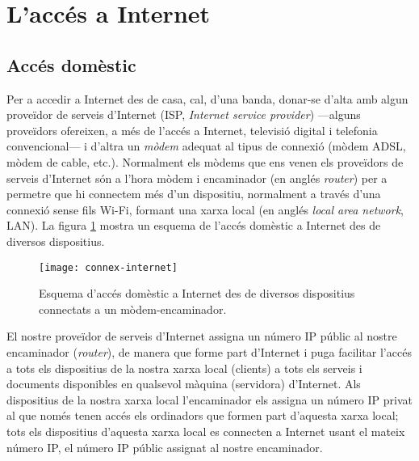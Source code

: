 


\section{L'accés a Internet}
\label{ss:adaI}

\subsection{Accés domèstic}
Per a accedir a Internet des de casa, cal, d'una banda, donar-se
d'alta amb algun proveïdor de serveis d'Internet (ISP, \emph{Internet
  service provider}) ---alguns proveïdors ofereixen, a més de l'accés
a Internet, televisió digital i telefonia convencional--- i d'altra un
\emph{mòdem} adequat al tipus de connexió (mòdem ADSL, mòdem de cable,
etc.). Normalment els mòdems que ens venen els proveïdors de serveis
d'Internet són a l'hora mòdem i encaminador (en anglés \emph{router})
per a permetre que hi connectem més d'un dispositiu, normalment a
través d'una connexió sense fils Wi-Fi, formant una xarxa local (en
anglés \emph{local area network}, LAN). La figura
\ref{fg:accesinternet} mostra un esquema de l'accés domèstic a
Internet des de diversos dispositius.

\begin{figure}
\centering
\texttt{[image: connex-internet]}
\caption{Esquema d'accés domèstic a Internet des de diversos
  dispositius connectats a un mòdem-encaminador.}
\label{fg:accesinternet}
\end{figure}

El nostre proveïdor de serveis d'Internet assigna un número IP públic
al nostre encaminador (\emph{router}), de manera que forme part
d'Internet i puga facilitar l'accés a tots els dispositius de la
nostra xarxa local (clients) a tots els serveis i documents
disponibles en qualsevol màquina (servidora) d'Internet. Als
dispositius de la nostra xarxa local l'encaminador els assigna un
número IP privat al que només tenen accés els ordinadors que formen
part d'aquesta xarxa local; tots els dispositius d'aquesta xarxa local
es connecten a Internet usant el mateix número IP, el número IP públic
assignat al nostre encaminador.

